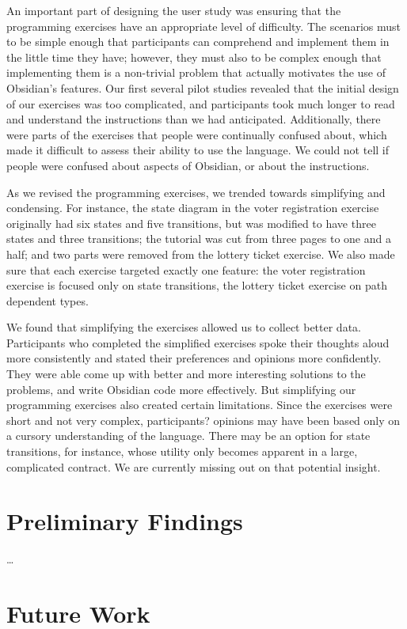 \documentclass[sigplan,10pt,review]{acmart}\settopmatter{printfolios=true}
\begin{document}
An important part of designing the user study was ensuring that the programming exercises have an appropriate level of difficulty. The 
scenarios must to be simple enough that participants can comprehend and implement them in the little time they have; however, 
they must also to be complex enough that implementing them is a non-trivial problem that actually motivates the use of 
Obsidian's features. Our first several pilot studies revealed that the initial design of our exercises was too complicated, and 
participants took much longer to read and understand the instructions than we had anticipated. Additionally, there were parts 
of the exercises that people were continually confused about, which made it difficult to assess their ability to use the language. 
We could not tell if people were confused about aspects of Obsidian, or about the instructions. 

As we revised the programming exercises, we trended towards simplifying and condensing. For instance, the state diagram in 
the voter registration exercise originally had six states and five transitions, but was modified to have three states and three 
transitions; the tutorial was cut from three pages to one and a half; and two parts were removed from the lottery ticket exercise. 
We also made sure that each exercise targeted exactly one feature: the voter registration exercise is focused only on state 
transitions, the lottery ticket exercise on path dependent types. 

We found that simplifying the exercises allowed us to collect better data. Participants who completed the simplified exercises 
spoke their thoughts aloud more consistently and stated their preferences and opinions more confidently. They were able
come up with better and more interesting solutions to the problems, and write Obsidian code more effectively. 
But simplifying our programming exercises also created certain limitations. Since the exercises were short and not very 
complex, participants? opinions may have been based only on a cursory understanding of the language. There may be an option 
for state transitions, for instance, whose utility only becomes apparent in a large, complicated contract. We are currently missing 
out on that potential insight. 

\section{Preliminary Findings}
\ldots

\section{Future Work}
\end{document}
